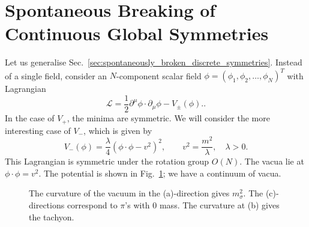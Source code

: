 
\section{Spontaneous Breaking of Continuous Global Symmetries}%
\label{sec:spontaneous_breaking_of_continuous_global_symmetries}

Let us generalise Sec.~\ref{sec:spontaneously_broken_discrete_symmetries}.
Instead of a single field, consider an $N$-component scalar field $\phi = (\phi_1, \phi_2, \dots, \phi_N)^T$ with Lagrangian
\begin{equation}
  \mathscr{L} = \frac{1}{2} \partial^{\mu} \phi \cdot \partial_{\mu} \phi - V_{\pm}(\phi)..
\end{equation}
In the case of $V_+$, the minima are symmetric. We will consider the more interesting case of $V_-$, which is given by
\begin{equation}
  V_-(\phi) = \frac{\lambda}{4} (\phi \cdot \phi - v^2)^2, \qquad v^2 = \frac{m^2}{\lambda}, \quad \lambda > 0.
\end{equation}
This Lagrangian is symmetric under the rotation group $O(N)$.
The vacua lie at $\phi \cdot \phi = v^2$.
The potential is shown in Fig.~\ref{fig:l15f1}; we have a continuum of vacua.
\begin{figure}[tbhp]
  \centering
  \def\svgwidth{0.4\columnwidth}
  
  \caption{The curvature of the vacuum in the (a)-direction gives $m_\sigma^2$. The (c)-directions correspond to $\pi$'s with $0$ mass. The curvature at (b) gives the tachyon.}
  \label{fig:l15f1}
\end{figure}


